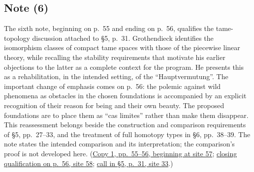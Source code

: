 \subsection*{Note (6)}
The sixth note, beginning on p.~55 and ending on p.~56, qualifies the
tame-topology discussion attached to \S5, p.~31. Grothendieck identifies
the isomorphism classes of compact tame spaces with those of the
piecewise linear theory, while recalling the stability requirements that
motivate his earlier objections to the latter as a complete context for
the program. He presents this as a rehabilitation, in the intended
setting, of the ``Hauptvermutung''. The important change of emphasis
comes on p.~56: the polemic against wild phenomena as obstacles in the
chosen foundations is accompanied by an explicit recognition of their
reason for being and their own beauty. The proposed foundations are to
place them as ``cas limites'' rather than make them disappear. This
reassessment belongs beside the construction and comparison requirements
of \S5, pp.~27--33, and the treatment of full homotopy types in \S6,
pp.~38--39. The note states the intended comparison and its interpretation;
the comparison's proof is not developed here.
(\href{https://grothendieck.umontpellier.fr/web/viewer.html?file=../119.pdf\#page=58}{Copy 1, pp.~55--56, beginning at site 57};
\href{https://grothendieck.umontpellier.fr/web/viewer.html?file=../119.pdf\#page=59}{closing qualification on p.~56, site 58};
\href{https://grothendieck.umontpellier.fr/web/viewer.html?file=../119.pdf\#page=34}{call in \S5, p.~31, site 33}.)
